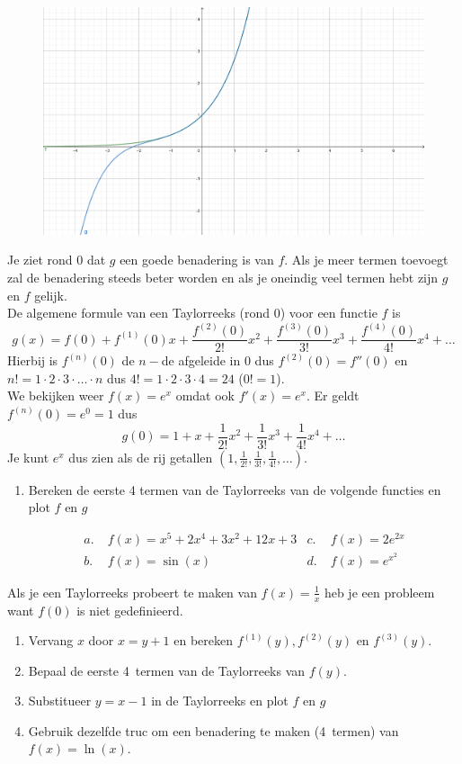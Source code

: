 \documentclass[../../main.tex]{subfiles}
\begin{document}
\begin{figure}[h]
    \centering
    \includegraphics[width=\textwidth]{./img/taylor.png}
\end{figure}

Je ziet rond 0 dat $g$ een goede benadering is van $f$. Als je meer termen toevoegt zal de benadering steeds beter worden en als je oneindig veel termen hebt zijn $g$ en $f$ gelijk.\\
De algemene formule van een Taylorreeks (rond 0) voor een functie $f$ is $$g(x)=f(0)+f^{(1)}(0)x+\frac{f^{(2)}(0)}{2!}x^2+\frac{f^{(3)}(0)}{3!}x^3+\frac{f^{(4)}(0)}{4!}x^4+\ldots$$
Hierbij is $f^{(n)}(0)$ de $n-$de afgeleide in 0 dus $f^{(2)}(0)=f''(0)$ en $n!=1\cdot2\cdot3\cdot\ldots\cdot n$ dus $4!=1\cdot2\cdot3\cdot4=24$ ($0!=1$).\\
We bekijken weer $f(x)=e^x$ omdat ook $f'(x)=e^x$. Er geldt $f^{(n)}(0)=e^0=1$ dus $$g(0)=1+x+\frac{1}{2!}x^2+\frac{1}{3!}x^3+\frac{1}{4!}x^4+\ldots$$
Je kunt $e^x$ dus zien als de rij getallen $(1,\frac{1}{2!},\frac{1}{3!},\frac{1}{4!},\ldots)$.

\begin{opdracht}
\begin{enumerate}
    \item Bereken de eerste 4 termen van de Taylorreeks van de volgende functies en plot $f$ en $g$

     \begin{align*}
        a.\;& f(x)=x^5+2x^4+3x^2+12x+3
        & c.\;& f(x)=2e^{2x}\\
        b.\;& f(x)=\sin(x)
        & d.\;& f(x)=e^{x^2}
    \end{align*}
\end{enumerate}
Als je een Taylorreeks probeert te maken van $f(x)=\frac{1}{x}$ heb je een probleem want $f(0)$ is niet gedefinieerd.
\begin{enumerate}[resume]
    \item Vervang $x$ door $x=y+1$ en bereken $f^{(1)}(y),f^{(2)}(y)$ en $f^{(3)}(y)$.
    \item Bepaal de eerste 4~termen van de Taylorreeks van $f(y)$.\\
    \item Substitueer $y=x-1$ in de Taylorreeks en plot $f$ en $g$\\
    \item Gebruik dezelfde truc om een benadering te maken (4~termen) van $f(x)=\ln(x)$.
\end{enumerate}
\end{opdracht}
\end{document}
